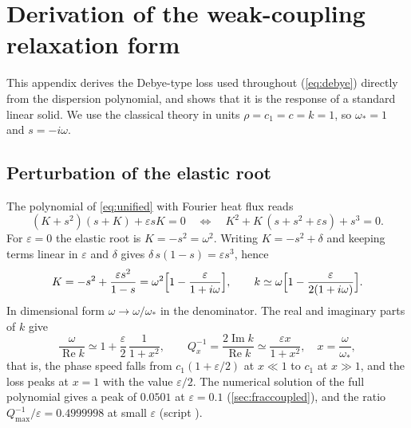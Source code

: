\section{Derivation of the weak-coupling relaxation form}\label{app:debye}

This appendix derives the Debye-type loss used throughout (\cref{eq:debye}) directly from the dispersion polynomial, and shows that it is the response of a standard linear solid. We use the classical theory in units $\rho=c_1=c=k=1$, so $\omega_*=1$ and $s=-i\omega$.

\subsection{Perturbation of the elastic root}
The polynomial of \cref{eq:unified} with Fourier heat flux reads
\begin{equation}
(K+s^2)(s+K)+\varepsilon sK=0\quad\Longleftrightarrow\quad K^2+K\,(s+s^2+\varepsilon s)+s^3=0 .
\end{equation}
For $\varepsilon=0$ the elastic root is $K=-s^2=\omega^2$. Writing $K=-s^2+\delta$ and keeping terms linear in $\varepsilon$ and $\delta$ gives $\delta\,s(1-s)=\varepsilon s^3$, hence
\begin{equation}
K=-s^2+\frac{\varepsilon s^2}{1-s}=\omega^2\Bigl[1-\frac{\varepsilon}{1+i\omega}\Bigr],\qquad
k\simeq\omega\Bigl[1-\frac{\varepsilon}{2(1+i\omega)}\Bigr].
\end{equation}
In dimensional form $\omega\to\omega/\omega_*$ in the denominator. The real and imaginary parts of $k$ give
\begin{equation}
\frac{\omega}{\operatorname{Re}k}\simeq1+\frac{\varepsilon}{2}\,\frac{1}{1+x^2},\qquad
Q_x^{-1}=\frac{2\operatorname{Im}k}{\operatorname{Re}k}\simeq\frac{\varepsilon x}{1+x^2},\quad x=\frac{\omega}{\omega_*},
\end{equation}
that is, the phase speed falls from $c_1(1+\varepsilon/2)$ at $x\ll1$ to $c_1$ at $x\gg1$, and the loss peaks at $x=1$ with the value $\varepsilon/2$. The numerical solution of the full polynomial gives a peak of $0.0501$ at $\varepsilon=0.1$ (\cref{sec:fraccoupled}), and the ratio $Q^{-1}_{\max}/\varepsilon=0.4999998$ at small $\varepsilon$ (script ).

